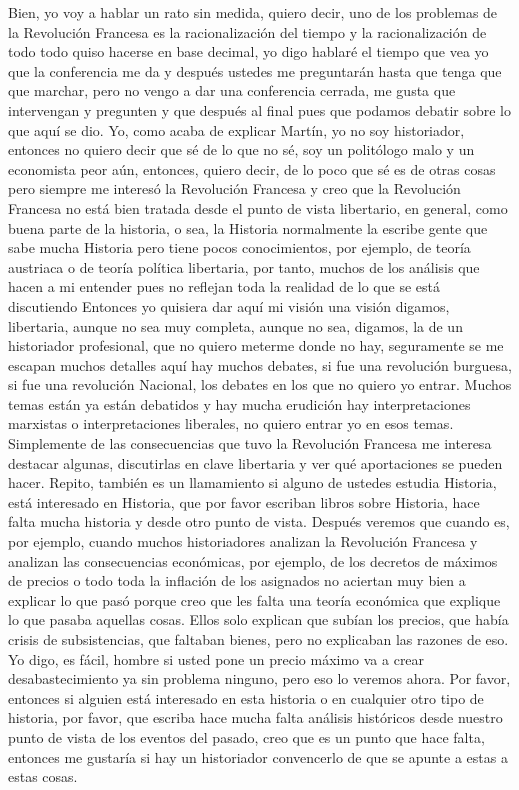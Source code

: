 Bien, yo voy a hablar un rato sin medida, quiero decir, uno de los problemas de la Revolución Francesa es la racionalización del tiempo y la racionalización de todo todo quiso hacerse en base decimal, yo digo hablaré el tiempo que vea yo que la conferencia me da y después ustedes me preguntarán hasta que tenga que que marchar, pero no vengo a dar una conferencia cerrada, me gusta que intervengan y pregunten y que después al final pues que podamos debatir sobre lo que aquí se dio. Yo, como acaba de explicar Martín, yo no soy historiador, entonces no quiero decir que sé de lo que no sé, soy un politólogo malo y un economista peor aún, entonces, quiero decir, de lo poco que sé es de otras cosas pero siempre me interesó la Revolución Francesa y creo que la Revolución Francesa no está bien tratada desde el punto de vista libertario, en general, como buena parte de la historia, o sea, la Historia normalmente la escribe gente que sabe mucha Historia pero tiene pocos conocimientos, por ejemplo, de teoría austriaca o de teoría política libertaria, por tanto, muchos de los análisis que hacen a mi entender pues no reflejan toda la realidad de lo que se está discutiendo Entonces yo quisiera dar aquí mi visión una visión digamos, libertaria, aunque no sea muy completa, aunque no sea, digamos, la de un historiador profesional, que no quiero meterme donde no hay, seguramente se me escapan muchos detalles aquí hay muchos debates, si fue una revolución burguesa, si fue una revolución Nacional, los debates en los que no quiero yo entrar. Muchos temas están ya están debatidos y hay mucha erudición hay interpretaciones marxistas o interpretaciones liberales, no quiero entrar yo en esos temas. Simplemente de las consecuencias que tuvo la Revolución Francesa me interesa destacar algunas, discutirlas en clave libertaria y ver qué aportaciones se pueden hacer. Repito, también es un llamamiento si alguno de ustedes estudia Historia, está interesado en Historia, que por favor escriban libros sobre Historia, hace falta mucha historia y desde otro punto de vista. Después veremos que cuando es, por ejemplo, cuando muchos historiadores analizan la Revolución Francesa y analizan las consecuencias económicas, por ejemplo, de los decretos de máximos de precios o todo toda la inflación de los asignados no aciertan muy bien a explicar lo que pasó porque creo que les falta una teoría económica que explique lo que pasaba aquellas cosas. Ellos solo explican que subían los precios, que había crisis de subsistencias, que faltaban bienes, pero no explicaban las razones de eso. Yo digo, es fácil, hombre si usted pone un precio máximo va a crear desabastecimiento ya sin problema ninguno, pero eso lo veremos ahora. Por favor, entonces si alguien está interesado en esta historia o en cualquier otro tipo de historia, por favor, que escriba hace mucha falta análisis históricos desde nuestro punto de vista de los eventos del pasado, creo que es un punto que hace falta, entonces me gustaría si hay un historiador convencerlo de que se apunte a estas a estas cosas.

